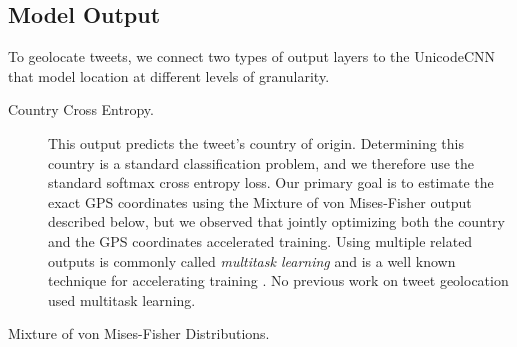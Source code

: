 \documentclass[sigconf,anonymous,review]{acmart}
\newcommand{\defn}[1]{\textit{#1}}
\begin{document}

\subsection{Model Output}
\label{sec:outputs}

To geolocate tweets, we connect two types of output layers to the UnicodeCNN that model location at different levels of granularity.

\begin{description}

    \item[Country Cross Entropy.]
        This output predicts the tweet's country of origin.
        Determining this country is a standard classification problem,
        and we therefore use the standard softmax cross entropy loss.
        Our primary goal is to estimate the exact GPS coordinates using the Mixture of von Mises-Fisher output described below,
        but we observed that jointly optimizing both the country and the GPS coordinates accelerated training.
        Using multiple related outputs is commonly called \defn{multitask learning} and is a well known technique for accelerating training \citep{zhang2017survey}.
        No previous work on tweet geolocation used multitask learning.

    \item[Mixture of von Mises-Fisher Distributions.]



\end{description}
\end{document}
